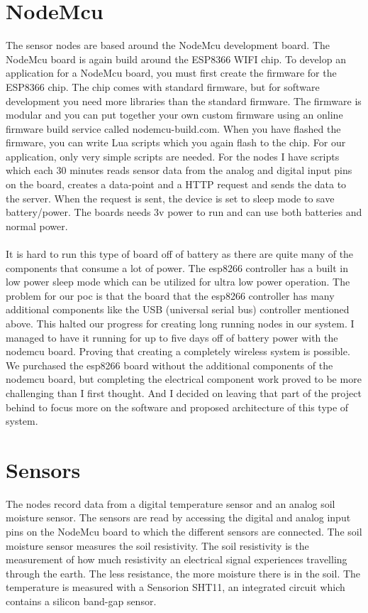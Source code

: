 \documentclass[]{uiophd}
\begin{document}
\section{NodeMcu}
The sensor nodes are based around the NodeMcu development board. The NodeMcu board is again build around the ESP8366 WIFI chip. To develop an application for a NodeMcu board, you must first create the firmware for the ESP8366 chip. The chip comes with standard firmware, but for software development you need more libraries than the standard firmware. The firmware is modular and you can put together your own custom firmware using an online firmware build service called nodemcu-build.com. When you have flashed the firmware, you can write Lua scripts which you again flash to the chip. For our application, only very simple scripts are needed. For the nodes I have scripts which each 30 minutes reads sensor data from the analog and digital input pins on the board, creates a data-point and a HTTP request and sends the data to the server. When the request is sent, the device is set to sleep mode to save battery/power. The boards needs 3v power to run and can use both batteries and normal power.
\\\\
It is hard to run this type of board off of battery as there are quite many of the components that consume a lot of power. The esp8266 controller has a built in low power sleep mode which can be utilized for ultra low power operation. The problem for our poc is that the board that the esp8266 controller has many additional components like the USB (universal serial bus) controller mentioned above. This halted our progress for creating long running nodes in our system. I managed to have it running for up to five days off of battery power with the nodemcu board. Proving that creating a completely wireless system is possible. We purchased the esp8266 board without the additional components of the nodemcu board, but completing the electrical component work proved to be more challenging than I first thought. And I decided on leaving that part of the project behind to focus more on the software and proposed architecture of this type of system.

\section{Sensors}
The nodes record data from a digital temperature sensor and an analog soil moisture sensor. The sensors are read by accessing the digital and analog input pins on the NodeMcu board to which the different sensors are connected. The soil moisture sensor measures the soil resistivity. The soil resistivity is the measurement of how much resistivity an electrical signal experiences travelling through the earth. The less resistance, the more moisture there is in the soil. The temperature is measured with a Sensorion SHT11, an integrated circuit which contains a silicon band-gap sensor. \parencite{sensorion}
\end{document}
